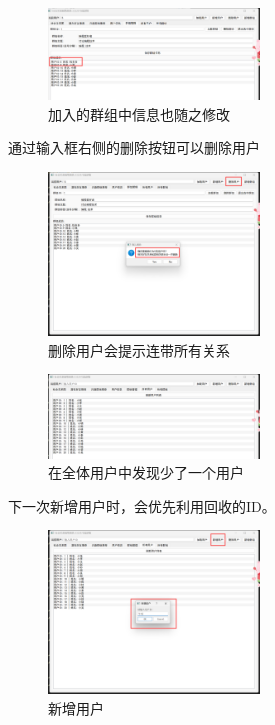 \documentclass[12pt,a4paper]{article}
\begin{document}
\begin{figure}[H]
    \centering
    \includegraphics[width=0.5\textwidth]{pt2-44.png}
    \caption{加入的群组中信息也随之修改}
\end{figure}

通过输入框右侧的删除按钮可以删除用户

\begin{figure}[H]
    \centering
    \includegraphics[width=0.5\textwidth]{pt2-45.png}
    \caption{删除用户会提示连带所有关系}
\end{figure}

\begin{figure}[H]
    \centering
    \includegraphics[width=0.5\textwidth]{pt2-46.png}
    \caption{在全体用户中发现少了一个用户}
\end{figure}

下一次新增用户时，会优先利用回收的ID。

\begin{figure}[H]
    \centering
    \includegraphics[width=0.5\textwidth]{pt2-47.png}
    \caption{新增用户}
\end{figure}
\end{document}
